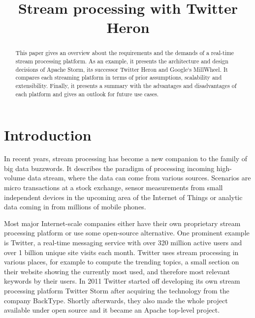 \documentclass[conference]{IEEEtran}
\begin{document}
\title{Stream processing with Twitter Heron}

\author{
}

\maketitle

\begin{abstract}
This paper gives an overview about the requirements and the demands of a real-time stream processing platform.
As an example, it presents the architecture and design decisions of Apache Storm, its successor Twitter Heron and Google`s MillWheel. %
It compares each streaming platform in terms of prior assumptions, scalability and extensibility.
Finally, it presents a summary with the advantages and disadvantages of each platform and gives an outlook for future use cases.

\end{abstract}

\section{Introduction}
\label{sec:Introduction}

In recent years, stream processing has become a new companion to the family of big data buzzwords.
It describes the paradigm of processing incoming high-volume data stream, where the data can come from various sources.
Scenarios are micro transactions at a stock exchange, sensor measurements from small independent devices in the upcoming area of the Internet of Things or analytic data coming in from millions of mobile phones.

Most major Internet-scale companies either have their own proprietary stream processing platform or use some open-source alternative.
One prominent example is Twitter, a real-time messaging service with over 320 million active users and over 1 billion unique site visits each month.
Twitter uses stream processing in various places, for example to compute the trending topics, a small section on their website showing the currently most used, and therefore most relevant keywords by their users.
In 2011 Twitter started off developing its own stream processing platform Twitter Storm after acquiring the technology from the company BackType.
Shortly afterwards, they also made the whole project available under open source and it became an Apache top-level project.
\end{document}

